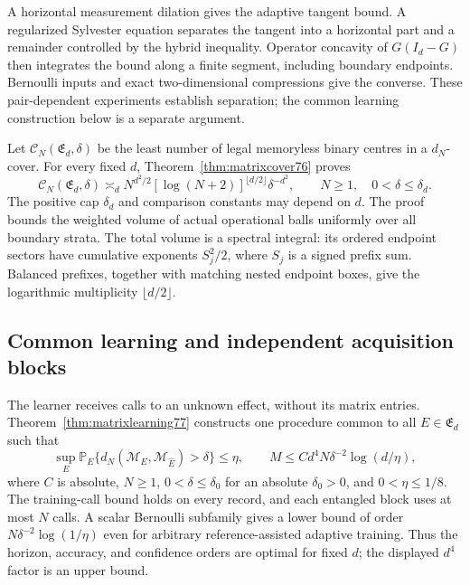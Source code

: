 A horizontal measurement dilation gives the adaptive tangent bound.
A regularized Sylvester equation separates the tangent into a
horizontal part and a remainder controlled by the hybrid inequality.
Operator concavity of $G(I_d-G)$ then integrates the bound along
a finite segment, including boundary endpoints.  Bernoulli inputs
and exact two-dimensional compressions give the converse.  These
pair-dependent experiments establish separation; the common
learning construction below is a separate argument.

Let $\mathcal C_N(\mathfrak E_d,\delta)$ be the least number of
legal memoryless binary centres in a $d_N$-cover.  For every fixed
$d$, Theorem~\ref{thm:matrixcover76} proves
\begin{equation}\label{eq:introentropy77}
 \mathcal C_N(\mathfrak E_d,\delta)
 \asymp_d N^{d^2/2}[\log(N+2)]^{\lfloor d/2\rfloor}\delta^{-d^2},
 \qquad N\ge1,\quad0<\delta\le\delta_d.
\end{equation}
The positive cap $\delta_d$ and comparison constants may depend
on $d$.  The proof bounds the weighted volume of actual operational
balls uniformly over all boundary strata.  The total volume is a
spectral integral: its ordered endpoint sectors have cumulative
exponents $S_j^2/2$, where $S_j$ is a signed prefix sum.  Balanced
prefixes, together with matching nested endpoint boxes, give the
logarithmic multiplicity $\lfloor d/2\rfloor$.

\subsection{Common learning and independent acquisition blocks}
The learner receives calls to an unknown effect, without its matrix
entries.  Theorem~\ref{thm:matrixlearning77} constructs one procedure
common to all $E\in\mathfrak E_d$ such that
\begin{equation}\label{eq:introlearning77}
 \sup_E\mathbb P_E\{d_N(\mathcal M_E,\mathcal M_{\widehat E})
                         >\delta\}\le\eta,
 \qquad
 M\le Cd^4N\delta^{-2}\log(d/\eta),
\end{equation}
where $C$ is absolute, $N\ge1$, $0<\delta\le\delta_0$ for an
absolute $\delta_0>0$, and $0<\eta\le1/8$.  The training-call
bound holds on every record, and each entangled block uses at most
$N$ calls.  A scalar Bernoulli subfamily gives a lower bound of
order $N\delta^{-2}\log(1/\eta)$ even for arbitrary
reference-assisted adaptive training.  Thus the horizon, accuracy,
and confidence orders are optimal for fixed $d$; the displayed
$d^4$ factor is an upper bound.

